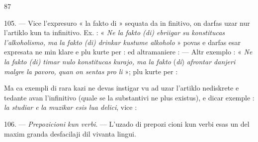 \begin{VUpage}[91]{87}

105. --- Vice l'expresuro « la fakto di » sequata da in\cc
finitivo, on darfas uzar nur l'artiklo kun ta infinitivo. Ex. :\nl
« \textit{Ne la fakto (di) ebriigar su konstitucas l'alkoholismo, ma}\nl
\textit{la fakto (di) drinkar kustume alkoholo} » povas e darfas esar\nl
expresata ne min klare e plu kurte per : \nl
{}\nl
ed altramaniere : \nl
{} --- Altr exemplo :\nl
« \textit{Ne la fakto (di) timar nulo konstitucas kurajo, ma la fakto}\nl
(\textit{di}) \textit{afrontar danjeri malgre la pavoro, quan on sentas pro}\nl
\textit{li} »; plu kurte per : \nl
{}\nl
{}

Ma ca exempli di rara kazi ne devas instigar vu ad uzar\nl
l'artiklo nediskrete e tedante avan l'infinitivo (quale se la\nl
substantivi ne plus existus), e dicar exemple : \textit{la studiar e}\nl
\textit{la muzikar esis lua delici}, vice : \nl
{}

\VUblanc{5.57pt}%
106. --- \textit{Prepozicioni kun verbi}. --- L'uzado di prepozi\cc
cioni kun verbi esas un del maxim granda desfacilaji dil\nl
vivanta lingui.


\end{VUpage}
